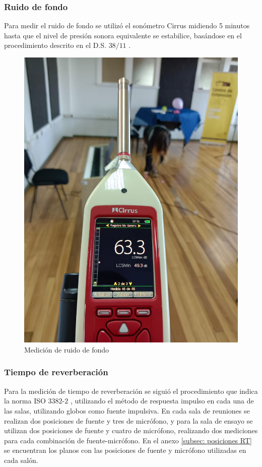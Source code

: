 \subsubsection{Ruido de fondo}
\noindent Para medir el ruido de fondo se utilizó el sonómetro Cirrus midiendo 5 minutos hasta que el nivel de presión sonora equivalente se estabilice, basándose en el procedimiento descrito en el D.S. $38/11$ \cite{ds:ds38}.
\begin{figure}[H]
    \centering
    \includegraphics[scale=0.15]{Imagenes/mediciones/medicionRDF.jpeg}
    \caption{Medición de ruido de fondo}
    \label{fig: medicionRDF}
\end{figure}
\subsubsection{Tiempo de reverberación}
\noindent Para la medición de tiempo de reverberación se siguió el procedimiento que indica la norma ISO $3382$-$2$ \cite{ISO3382-2}, utilizando el método de respuesta impulso en cada una de las salas, utilizando globos como fuente impulsiva.
En cada sala de reuniones se realizan dos posiciones de fuente y tres de micrófono, y para la sala de ensayo se utilizan dos posiciones de fuente y cuatro de micrófono, realizando dos mediciones para cada combinación de fuente-micrófono. En el anexo \ref{subsec: posiciones RT} se encuentran los planos con las posiciones de fuente y micrófono utilizadas en cada salón.

